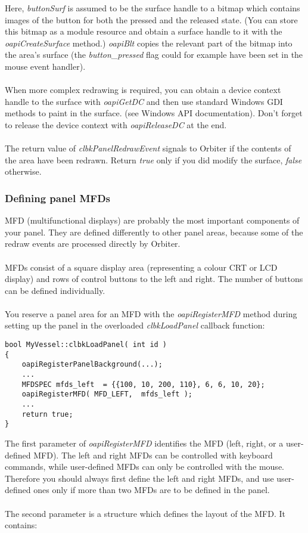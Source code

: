 \documentclass[Orbiter Developer Manual.tex]{subfiles}
\begin{document}
\noindent
Here, \textit{buttonSurf} is assumed to be the surface handle to a bitmap which contains images of the button for both the pressed and the released state. (You can store this bitmap as a module resource and obtain a surface handle to it with the \textit{oapiCreateSurface} method.) \textit{oapiBlt} copies the relevant part of the bitmap into the area's surface (the \textit{button\_pressed} flag could for example have been set in the mouse event handler).\\
\\
When more complex redrawing is required, you can obtain a device context handle to the surface with \textit{oapiGetDC} and then use standard Windows GDI methods to paint in the surface. (see Windows API documentation). Don't forget to release the device context with \textit{oapiReleaseDC} at the end.\\
\\
The return value of \textit{clbkPanelRedrawEvent} signals to Orbiter if the contents of the area have been redrawn. Return \textit{true} only if you did modify the surface, \textit{false} otherwise.


\subsubsection{Defining panel MFDs}
MFD (multifunctional displays) are probably the most important components of your panel. They are defined differently to other panel areas, because some of the redraw events are processed directly by Orbiter.\\
\\
MFDs consist of a square display area (representing a colour CRT or LCD display) and rows of control buttons to the left and right. The number of buttons can be defined individually.\\
\\
You reserve a panel area for an MFD with the \textit{oapiRegisterMFD} method during setting up the panel in the overloaded \textit{clbkLoadPanel} callback function:

\begin{lstlisting}
bool MyVessel::clbkLoadPanel( int id )
{
	oapiRegisterPanelBackground(...);
	...
	MFDSPEC mfds_left  = {{100, 10, 200, 110}, 6, 6, 10, 20};
	oapiRegisterMFD( MFD_LEFT,  mfds_left );
	...
	return true;
}
\end{lstlisting}

\noindent
The first parameter of \textit{oapiRegisterMFD} identifies the MFD (left, right, or a user-defined MFD). The left and right MFDs can be controlled with keyboard commands, while user-defined MFDs can only be controlled with the mouse. Therefore you should always first define the left and right MFDs, and use user-defined ones only if more than two MFDs are to be defined in the panel.\\
\\
The second parameter is a structure which defines the layout of the MFD. It contains:
\end{document}

